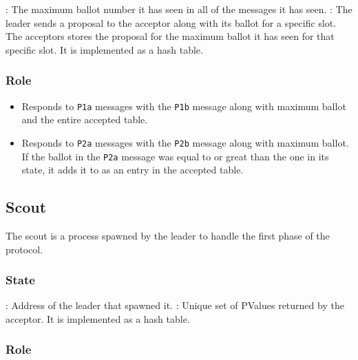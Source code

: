 \begin{itemize}
    : The maximum ballot number it has seen in all
    of the messages it has seen.
    : The leader sends a proposal to the acceptor along with
    its ballot for a specific slot. The acceptors stores the proposal for
    the maximum ballot it has seen for that specific slot. It is implemented as
    a hash table.
\end{itemize}

\subsubsection{Role}

\begin{itemize}
  \item Responds to \texttt{P1a} messages with the \texttt{P1b} message 
    along with maximum ballot and the entire accepted table.
  \item Responds to \texttt{P2a} messages with the \texttt{P2b} message
    along with maximum ballot. If the ballot in the \texttt{P2a} message
    was equal to or great than the one in its state, it adds it to as
    an entry in the accepted table.
\end{itemize}


\subsection{Scout}

The scout is a process spawned by the leader to handle the first phase of the
protocol.

\subsubsection{State}
\label{section:scout.state}

\begin{itemize}
    : Address of the leader that spawned it.
    :%
    Unique set of PValues returned by the acceptor. It is implemented as a
    hash table.
\end{itemize}

\subsubsection{Role}

